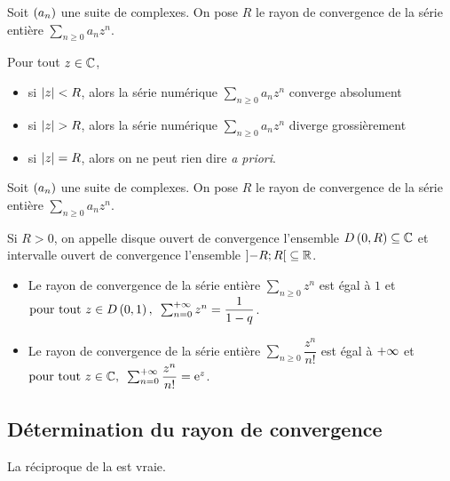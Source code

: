 \begin{prop}
Soit \(\left(a_n\right)\) une suite de complexes. On pose \(R\) le rayon de convergence de la série entière \(\sum_{n\geq0}a_nz^n\).

Pour tout \(z\in\mathbb{C}\),

\begin{itemize}
    \item si \(\left\lvert z\right\rvert<R\), alors la série numérique \(\sum_{n\geq0}a_nz^n\) converge absolument \\
    \item si \(\left\lvert z\right\rvert>R\), alors la série numérique \(\sum_{n\geq0}a_nz^n\) diverge grossièrement \\
    \item si \(\left\lvert z\right\rvert=R\), alors on ne peut rien dire \textit{a priori}.
\end{itemize}
\end{prop}

\begin{defi}
Soit \(\left(a_n\right)\) une suite de complexes. On pose \(R\) le rayon de convergence de la série entière \(\sum_{n\geq0}a_nz^n\).

Si \(R>0\), on appelle disque ouvert de convergence l'ensemble \(D\left(0,R\right)\subseteq\mathbb{C}\) et intervalle ouvert de convergence l'ensemble \(\left]-R;R\right[\subseteq\mathbb{R}\).
\end{defi}

\begin{ex}
\begin{itemize}
    \item Le rayon de convergence de la série entière \(\sum_{n\geq0}z^n\) est égal à \(1\) et \(\quantifs{\tpt z\in\disqueo{0}{1}}\sum_{n=0}^{\pinf}z^n=\dfrac{1}{1-q}\). \\
    \item Le rayon de convergence de la série entière \(\sum_{n\geq0}\dfrac{z^n}{n!}\) est égal à \(+\infty\) et \(\quantifs{\tpt z\in\C}\sum_{n=0}^{\pinf}\dfrac{z^n}{n!}=\e{z}\).
\end{itemize}
\end{ex}

\subsection{Détermination du rayon de convergence}

La réciproque de la  est vraie.

